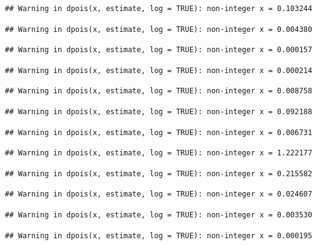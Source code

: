 \documentclass[]{article}
\begin{document}
\begin{verbatim}
## Warning in dpois(x, estimate, log = TRUE): non-integer x = 0.103244
\end{verbatim}

\begin{verbatim}
## Warning in dpois(x, estimate, log = TRUE): non-integer x = 0.004380
\end{verbatim}

\begin{verbatim}
## Warning in dpois(x, estimate, log = TRUE): non-integer x = 0.000157
\end{verbatim}

\begin{verbatim}
## Warning in dpois(x, estimate, log = TRUE): non-integer x = 0.000214
\end{verbatim}

\begin{verbatim}
## Warning in dpois(x, estimate, log = TRUE): non-integer x = 0.008758
\end{verbatim}

\begin{verbatim}
## Warning in dpois(x, estimate, log = TRUE): non-integer x = 0.092188
\end{verbatim}

\begin{verbatim}
## Warning in dpois(x, estimate, log = TRUE): non-integer x = 0.006731
\end{verbatim}

\begin{verbatim}
## Warning in dpois(x, estimate, log = TRUE): non-integer x = 1.222177
\end{verbatim}

\begin{verbatim}
## Warning in dpois(x, estimate, log = TRUE): non-integer x = 0.215582
\end{verbatim}

\begin{verbatim}
## Warning in dpois(x, estimate, log = TRUE): non-integer x = 0.024607
\end{verbatim}

\begin{verbatim}
## Warning in dpois(x, estimate, log = TRUE): non-integer x = 0.003530
\end{verbatim}

\begin{verbatim}
## Warning in dpois(x, estimate, log = TRUE): non-integer x = 0.000195
\end{verbatim}
\end{document}
